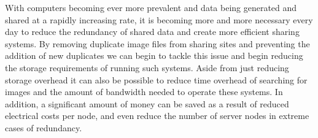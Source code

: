 \documentclass[11pt]{article}
\begin{document}
With computers becoming ever more prevalent and data being generated and shared at a rapidly increasing rate, it is becoming more and more necessary every day to reduce the redundancy of shared data and create more efficient sharing systems. By removing duplicate image files from sharing sites and preventing the addition of new duplicates we can begin to tackle this issue and begin reducing the storage requirements of running such systems. Aside from just reducing storage overhead it can also be possible to reduce time overhead of searching for images and the amount of bandwidth needed to operate these systems. In addition, a significant amount of money can be saved as a result of reduced electrical costs per node, and even reduce the number of server nodes in extreme cases of redundancy.

\newpage


\end{document}
